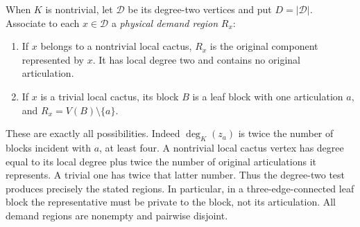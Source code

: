 \documentclass[11pt,letterpaper]{article}
\begin{document}
When $K$ is nontrivial, let $\mathcal D$ be its degree-two vertices and put $D=|\mathcal D|$. Associate to each $x\in\mathcal D$ a \emph{physical demand region} $R_x$:
\begin{enumerate}
\item If $x$ belongs to a nontrivial local cactus, $R_x$ is the original component represented by $x$. It has local degree two and contains no original articulation.
\item If $x$ is a trivial local cactus, its block $B$ is a leaf block with one articulation $a$, and $R_x=V(B)\setminus\{a\}$.
\end{enumerate}
These are exactly all possibilities. Indeed $\deg_K(z_a)$ is twice the number of blocks incident with $a$, at least four. A nontrivial local cactus vertex has degree equal to its local degree plus twice the number of original articulations it represents. A trivial one has twice that latter number. Thus the degree-two test produces precisely the stated regions. In particular, in a three-edge-connected leaf block the representative must be private to the block, not its articulation. All demand regions are nonempty and pairwise disjoint.
\end{document}
